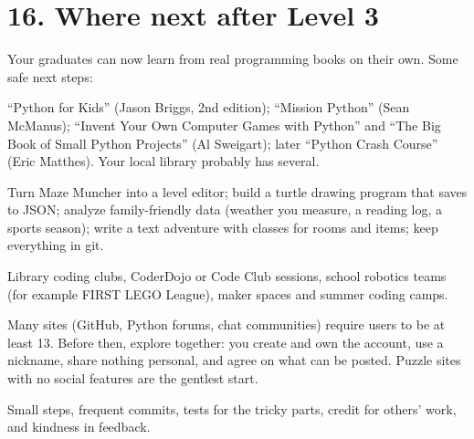 \documentclass[level=3,teacher]{kidscode}
\begin{document}
\section{16. Where next after Level 3}

Your graduates can now learn from real programming books on their own. Some safe next steps:

\begin{description}[leftmargin=0pt,itemsep=4pt,font=\bfseries]
\item[Books (offline, great with Thonny).] \enquote{Python for Kids} (Jason Briggs, 2nd edition);
\enquote{Mission Python} (Sean McManus); \enquote{Invent Your Own Computer Games with Python} and
\enquote{The Big Book of Small Python Projects} (Al Sweigart); later \enquote{Python Crash Course}
(Eric Matthes). Your local library probably has several.
\item[Offline projects.] Turn Maze Muncher into a level editor; build a turtle drawing program that
saves to JSON; analyze family-friendly data (weather you measure, a reading log, a sports season);
write a text adventure with classes for rooms and items; keep everything in git.
\item[Local, in-person clubs.] Library coding clubs, CoderDojo or Code Club sessions, school
robotics teams (for example FIRST LEGO League), maker spaces and summer coding camps.
\item[Online, with a parent.] Many sites (GitHub, Python forums, chat communities) require users to
be at least 13. Before then, explore together: you create and own the account, use a nickname,
share nothing personal, and agree on what can be posted. Puzzle sites with no social features are
the gentlest start.
\item[Keep the habits.] Small steps, frequent commits, tests for the tricky parts, credit for
others' work, and kindness in feedback.
\end{description}
\end{document}

